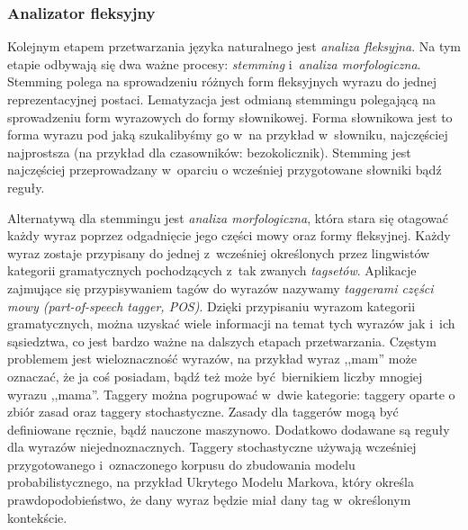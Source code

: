 \documentclass[a4paper, twoside, 12pt]{report}
\begin{document}
            \subsubsection{Analizator fleksyjny}
                Kolejnym etapem przetwarzania języka naturalnego jest \emph{analiza fleksyjna}. Na tym etapie odbywają się dwa
                ważne procesy: \emph{stemming} i~\emph{analiza morfologiczna}. Stemming polega na sprowadzeniu różnych form fleksyjnych wyrazu do jednej
                reprezentacyjnej postaci. Lematyzacja jest odmianą stemmingu polegającą na sprowadzeniu form wyrazowych do
                formy słownikowej.
                Forma słownikowa jest to forma wyrazu pod jaką szukalibyśmy go w~na przykład w~słowniku, najczęściej najprostsza
                (na przykład dla czasowników: bezokolicznik). Stemming jest najczęściej przeprowadzany w~oparciu o wcześniej
                przygotowane słowniki bądź reguły.

                Alternatywą dla stemmingu jest \emph{analiza morfologiczna}, która stara się otagować każdy wyraz poprzez odgadnięcie
                jego części mowy oraz formy fleksyjnej. Każdy wyraz zostaje przypisany do jednej z~wcześniej określonych
                przez lingwistów kategorii gramatycznych pochodzących z~tak zwanych \emph{tagsetów}. Aplikacje zajmujące
                się przypisywaniem tagów do wyrazów nazywamy \emph{taggerami części mowy (part-of-speech tagger, POS)}. Dzięki przypisaniu
                wyrazom kategorii gramatycznych, można uzyskać wiele informacji na temat tych wyrazów jak i~ich sąsiedztwa,
                co jest bardzo ważne na dalszych etapach przetwarzania. Częstym problemem jest wieloznaczność wyrazów, na przykład
                wyraz ,,mam'' może oznaczać, że ja coś posiadam, bądź też może być biernikiem liczby mnogiej wyrazu ,,mama''.
                Taggery można pogrupować w~dwie kategorie: taggery oparte o zbiór zasad oraz taggery stochastyczne. Zasady
                dla taggerów mogą być definiowane ręcznie, bądź nauczone maszynowo. Dodatkowo dodawane są reguły dla wyrazów
                niejednoznacznych. Taggery stochastyczne używają wcześniej przygotowanego i~oznaczonego korpusu do zbudowania
                modelu probabilistycznego, na przykład Ukrytego Modelu Markova, który określa prawdopodobieństwo, że dany
                wyraz będzie miał dany tag w~określonym kontekście\cite{SPEECHANDLANGUAGEPROCESSING}.
\end{document}
